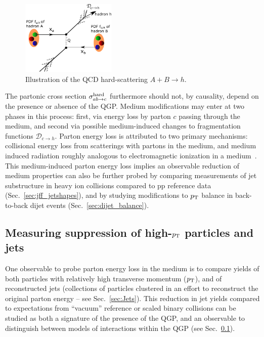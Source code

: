 \begin{figure}[hbtp]
\begin{center}
\includegraphics[width=0.4\textwidth]{illustrations/qcd_factor.pdf}
\caption[Illustration of QCD cross section factorization]{Illustration of the QCD hard-scattering $A+B \rightarrow h$.}
\label{fig:illustration_qgp_factor}
\end{center}
\end{figure}

The partonic cross section $\sigma_{ab\rightarrow c}^{\rm hard}$ furthermore should not, by causality, depend on the presence or absence of the QGP.  Medium modifications may enter at two phases in this process:  first, via energy loss by parton $c$ passing through the medium, and second via possible medium-induced changes to fragmentation functions $\mathscr{D}_{c\rightarrow h}$.  Parton energy loss is attributed to two primary mechanisms:  collisional energy loss from scatterings with partons in the medium, and medium induced radiation roughly analogous to electromagnetic ionization in a medium~\cite{Bjorken:1982tu, d'Enterria:2009am}.  This medium-induced parton energy loss implies an observable reduction of medium properties can also be further probed by comparing measurements of jet substructure in heavy ion collisions compared to pp reference data (Sec.~\ref{sec:jff_jetshapes}), and by studying modifications to $p_{\rm T}$ balance in back-to-back dijet events (Sec.~\ref{sec:dijet_balance}).

\subsection{Measuring suppression of high-$p_{\rm T}$ particles and jets}
\label{sec:raa}

One observable to probe parton energy loss in the medium is to compare yields of both particles with relatively high transverse momentum ($p_{\rm T}$), and of reconstructed jets (collections of particles clustered in an effort to reconstruct the original parton energy -- see Sec.~\ref{sec:Jets}).  This reduction in jet yields compared to expectations from ``vacuum'' reference or scaled binary collisions can be studied as both a signature of the presence of the QGP, and an observable to distinguish between models of interactions within the QGP (see Sec.~\ref{sec:raa}).  

